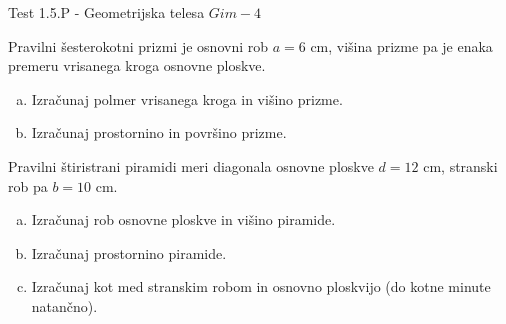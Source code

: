 \documentclass[a4paper,12pt]{letter}
\renewcommand{\headrulewidth}{3pt}
\renewcommand{\headrulewidth}{0.3pt}
\newcounter{tocke}
\begin{document}
\pagestyle{fancy}
\renewcommand\headrulewidth{0pt}
\lhead{}\chead{}\rhead{}
\rfoot{\vspace*{-2\baselineskip}}
\renewcommand{\vec}{\overrightarrow}
\def\programletnik{Gim - 4}
\def\naslov{Test 1.5.P - }
\def\sklop{Geometrijska telesa}
\def\tockeA{4+5}
\def\tockeB{3+4+4}
\def\tockeC{4+4}
\def\tockeD{4+4}
\begin{minipage}{20cm}
\begin{bclogo}[couleur=brown!30,
  arrondi=0,ombre=true, couleurOmbre=gray!50,
logo =\bcplume,
  noborder=true]
{\textrm{{\Large{\naslov \sklop} \Huge{}
\large{} \hfill $\programletnik$}}}
\end{bclogo}
\end{minipage}
\begin{minipage}{20cm}
\begin{bclogo}[couleur=brown!30,
  arrondi=0,ombre=true, couleurOmbre=gray!50,
logo =\bcplume,
  noborder=true]
{\textrm{{}}}
\end{bclogo}
\end{minipage}

\begin{naloga}[\hfill $\tockeA$] \addtocounter{tocke}{\numexpr\tockeA\relax}
Pravilni \v{s}esterokotni prizmi je osnovni rob $a=6$ cm, vi\v{s}ina prizme pa je enaka premeru vrisanega kroga osnovne ploskve.
\begin{enumerate}[a)]
\item Izra\v{c}unaj polmer vrisanega kroga in vi\v{s}ino prizme.
\item Izra\v{c}unaj prostornino in povr\v{s}ino prizme.
\end{enumerate}
\end{naloga}\newpage

\begin{naloga}[\hfill $\tockeB$] \addtocounter{tocke}{\numexpr\tockeB\relax}
Pravilni \v{s}tiristrani piramidi meri diagonala osnovne ploskve $d=12$ cm, stranski rob pa $b=10$ cm.
\begin{enumerate}[a)]
\item Izra\v{c}unaj rob osnovne ploskve in vi\v{s}ino piramide.
\item Izra\v{c}unaj prostornino piramide.
\item Izra\v{c}unaj kot med stranskim robom in osnovno ploskvijo (do kotne minute natan\v{c}no).
\end{enumerate}
\end{naloga}\newpage
\end{document}
